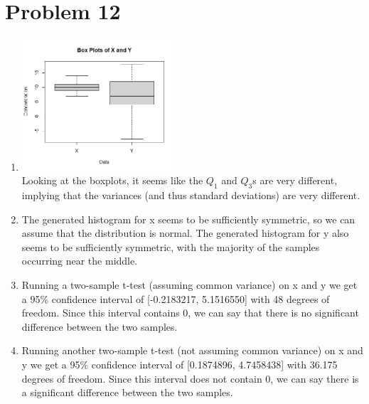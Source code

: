 \documentclass{article}
\begin{document}
\pagebreak
\section*{Problem 12}
\begin{enumerate}[label=(\alph*)]
    \item
          \begin{multicols}{2}
              \includegraphics[width=0.45\textwidth]{xyboxplots.png} \\
              Looking at the boxplots, it seems like the \(Q_1\) and \(Q_3\)s are very different, implying that the variances (and thus standard deviations) are very different.
          \end{multicols}
    \item The generated histogram for x seems to be sufficiently symmetric, so we can assume that the distribution is normal.
          The generated histogram for y also seems to be sufficiently symmetric, with the majority of the samples occurring near the middle.
    \item Running a two-sample t-test (assuming common variance) on x and y we get a 95\% confidence interval of [-0.2183217, 5.1516550] with 48 degrees of freedom. Since this interval contains 0, we can say that there is no significant difference between the two samples.
    \item Running another two-sample t-test (not assuming common variance) on x and y we get a  95\% confidence interval of [0.1874896, 4.7458438] with 36.175 degrees of freedom. Since this interval does not contain 0, we can say there is a significant difference between the two samples.
\end{enumerate}

\pagebreak
\end{document}
